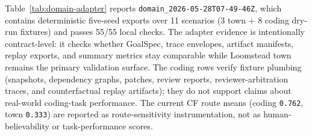 Table~\ref{tab:domain-adapter} reports \texttt{domain\_2026-05-28T07-49-46Z}, which contains deterministic five-seed exports over 11 scenarios (3 town + 8 coding dry-run fixtures) and passes 55/55 local checks. The adapter evidence is intentionally contract-level: it checks whether GoalSpec, trace envelopes, artifact manifests, replay exports, and summary metrics stay comparable while Loomstead town remains the primary validation surface. The coding rows verify fixture plumbing (snapshots, dependency graphs, patches, review reports, reviewer-arbitration traces, and counterfactual replay artifacts); they do not support claims about real-world coding-task performance. The current CF route means (coding \texttt{0.762}, town \texttt{0.333}) are reported as route-sensitivity instrumentation, not as human-believability or task-performance scores.


